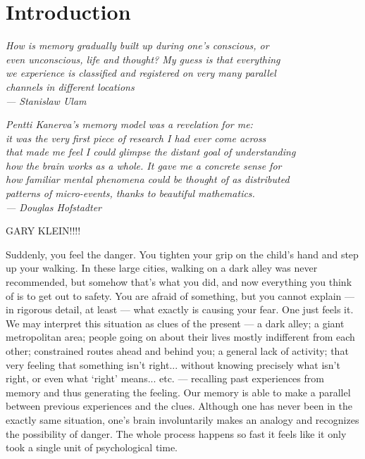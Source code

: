 
\chapter{Introduction}

\bigskip

\begin{flushright}{\slshape
    {How is memory gradually built up during one's conscious, or\\
    even unconscious, life and thought?  My guess is that everything \\
    we experience is classified and registered on very many parallel \\
    channels in different locations} \\ \medskip
    --- Stanislaw Ulam}

    \bigskip
    \bigskip
    {\slshape Pentti Kanerva's memory model was a revelation for me: \\
it was the very first piece of research I had ever come across\\
that made me feel I could glimpse the distant goal of understanding \\
how the brain works as a whole. It gave me a concrete sense for\\
how familiar mental phenomena could be thought of as distributed\\
patterns of micro-events, thanks to beautiful mathematics. \\ \medskip
--- Douglas Hofstadter}


\end{flushright}
\bigskip
\bigskip



GARY KLEIN!!!!



Suddenly, you feel the danger.  You tighten your grip on the child's hand and step up your walking.  In these large cities, walking on a dark alley was never recommended, but somehow that's what you did, and now everything you think of is to get out to safety.  You are afraid of something, but you cannot explain --- in rigorous detail, at least --- what exactly is causing your fear. One just feels it. We may interpret this situation as clues of the present --- a dark alley; a giant metropolitan area; people going on about their lives mostly indifferent from each other; constrained routes ahead and behind you; a general lack of activity; that very feeling that something isn't right... without knowing precisely what isn't right, or even what `right' means... etc. --- recalling past experiences from memory and thus generating the feeling. Our memory is able to make a parallel between previous experiences and the clues. Although one has never been in the exactly same situation, one's brain involuntarily makes an analogy and recognizes the possibility of danger. The whole process happens so fast it feels like it only took a single unit of psychological time.

